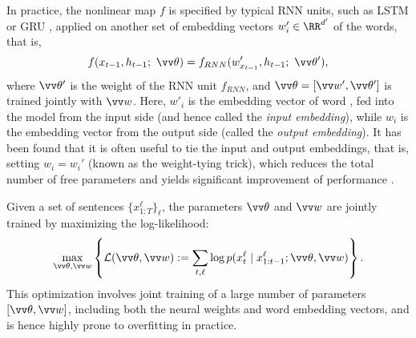 \documentclass{article}
\newcommand{\softmax}{{\mathrm{Softmax}}}
\begin{document}
In practice, the nonlinear map $f$ is specified by typical RNN units, 
such as LSTM \citep{hochreiter1997long} or GRU \citep{chung2014empirical}, 
applied on another set of embedding vectors $w_i'\in \RR^{d'}$ of the words, 
that is, 
$$
f(x_{t-1}, h_{t-1}; ~\vv\theta) = f_{RNN}(w'_{x_{t-1}}, h_{t-1}; ~\vv\theta'), 
$$
where $\vv\theta'$ is the weight of the RNN unit $f_{RNN}$, 
and  $\vv\theta = [\vv w', \vv\theta']$ is trained jointly with $\vv w$. 
Here, $w'_i$ is the embedding vector of word , fed into the model from the input side (and hence called the \emph{input embedding}), while $w_i$ is the embedding vector from the output side (called the \emph{output embedding}). 
It has been found that it is often useful to tie the input and output embeddings, that is, setting $w_i = w_i'$ (known as the weight-tying trick), 
which reduces the total number of free parameters and yields significant improvement of performance   \citep[e.g.,][]{press2016using, inan2016tying}. 




Given a set of sentences $
\{x_{1:T}^\ell\}_{\ell}$, 
the parameters $\vv\theta$ and $\vv w$ are jointly trained by maximizing the log-likelihood:  
\begin{align} \label{equ:mle}
\max_{\vv\theta, \vv w} \left \{ \mathcal{L}(\vv \theta, \vv w) := \sum_{t,\ell} \log p(x_t^\ell\mid x_{1:t-1}^\ell; \vv \theta, \vv w) \right\}. 
\end{align}
This optimization involves joint training of 
a large number of parameters $[\vv\theta,\vv w]$, including both the neural weights and word embedding vectors,  and is hence highly prone to overfitting in practice. 






\iffalse 
Further, $p(x_t~|~h_t)$ is specified by a softmax function 
$$
p(x_t~|~h_t; M) \overset{def}{=} \frac{\exp(m_{x_t}^\top  h_t)}{\sum_{j=1}^{|V|} \exp(m_{j}^\top  h_t)}
$$
where $M \in \R^{ d_h \times |V|}$ is the  coefficients of the softmax and 
$m_{x_t} \in  \R^{d_h}$ is its $x_t$-th column. 
The bias term is dropped for simplicity. 
It has been found useful to make the weight coefficient $m_{x_t}$ equal the embedding vector  $w_{x_t}$, that is, $m_{x_t} = w_{x_t}$, if the hidden state dimension $d_h$ equals the embedding dimension $d$. This yields the  
weight tying softmax function \citep{cite},
$$
p(x_t~|~h_t) = \softmax(W^\top h_t) =  \frac{\exp(w_{x_t}^\top h_t)}{\sum_{j=1}^{|V|} \exp(w_{j}^\top h_t)}.
$$
Training language models with weight-tying could reduce the total free parameters
substantially and yield significant improvements to the standard neural language model \citep{press2016using, inan2016tying}. 
Then the netowrk is typically trained by minimising the negative log-likelihood:
$$
\mathcal{L}(\theta, W) := \sum_{t} - \log p(x_t\mid h_t; \theta, W),
$$
where $\{\theta, W\}$ are model parameters.
\fi  
\end{document}
